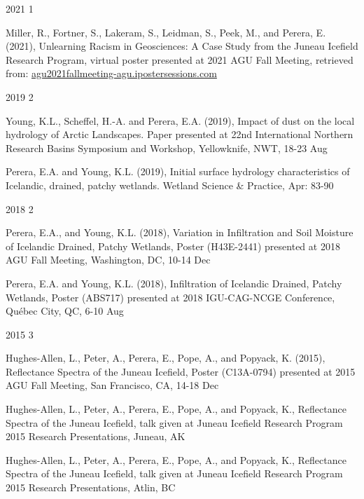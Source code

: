 \documentclass{../styles/cv}
\begin{document}
\subsectiondate
    {2021}
    {1}
\resumesublistbegin
    \item Miller, R., Fortner, S., Lakeram, S., Leidman, S., Peek, M., and Perera, E. (2021), Unlearning Racism in Geosciences: A Case Study from the Juneau Icefield Research Program, virtual poster presented at 2021 AGU Fall Meeting, retrieved from: \href{https://agu2021fallmeeting-agu.ipostersessions.com/Default.aspx?s=0C-7C-95-47-65-84-5B-A9-3A-75-41-46-54-B9-C8-18}{agu2021fallmeeting-agu.ipostersessions.com}
\resumesublistend

\subsectiondate
    {2019}
    {2}
\resumesublistbegin
    \item Young, K.L., Scheffel, H.-A. and Perera, E.A. (2019), Impact of dust on the local hydrology of Arctic Landscapes. Paper presented at 22nd International Northern Research Basins Symposium and Workshop, Yellowknife, NWT, 18-23 Aug
    \item Perera, E.A. and Young, K.L. (2019), Initial surface hydrology characteristics of Icelandic, drained, patchy wetlands. Wetland Science \& Practice, Apr: 83-90
\resumesublistend

\subsectiondate
    {2018}
    {2}
\resumesublistbegin
    \item Perera, E.A., and Young, K.L. (2018), Variation in Infiltration and Soil Moisture of Icelandic Drained, Patchy Wetlands, Poster (H43E-2441) presented at 2018 AGU Fall Meeting, Washington, DC, 10-14 Dec
    \item Perera, E.A. and Young, K.L. (2018), Infiltration of Icelandic Drained, Patchy Wetlands, Poster (ABS717) presented at 2018 IGU-CAG-NCGE Conference, Québec City, QC, 6-10 Aug
\resumesublistend

\subsectiondate
    {2015}
    {3}
\resumesublistbegin
    \item Hughes-Allen, L., Peter, A., Perera, E., Pope, A., and Popyack, K. (2015), Reflectance Spectra of the Juneau Icefield, Poster (C13A-0794) presented at 2015 AGU Fall Meeting, San Francisco, CA, 14-18 Dec
    \item Hughes-Allen, L., Peter, A., Perera, E., Pope, A., and Popyack, K., Reflectance Spectra of the Juneau Icefield, talk given at Juneau Icefield Research Program 2015 Research Presentations, Juneau, AK
    \item Hughes-Allen, L., Peter, A., Perera, E., Pope, A., and Popyack, K., Reflectance Spectra of the Juneau Icefield, talk given at Juneau Icefield Research Program 2015 Research Presentations, Atlin, BC
\resumesublistend
\end{document}
